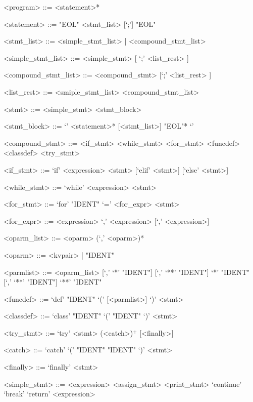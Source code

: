\documentclass[10pt,a4paper]{article}
\begin{document}
\setlength{\grammarparsep}{10pt plus 1pt minus 1pt} %
\setlength{\grammarindent}{12em} %
\begin{grammar}


<program> ::= <statement>*

<statement> ::= "EOL" 
    \alt <stmt_list> [`;'] "EOL"

<stmt_list> ::= <simple_stmt_list> | <compound_stmt_list>

<simple_stmt_list> ::= <simple_stmt> [ `;' <list_rest> ]

<compound_stmt_list> ::= <compound_stmt> [`;' <list_rest> ]

<list_rest> ::= <smiple_stmt_list> 
    \alt <compound_stmt_list>

<stmt> ::= <simple_stmt> 
    \alt <stmt_block>

<stmt_block> ::= `{' <statement>* [<stmt_list>] "EOL"* `}'

<compound_stmt> ::= <if_stmt>
	\alt <while_stmt>
	\alt <for_stmt>
	\alt <funcdef>
    \alt <classdef>
    \alt <try_stmt>

<if_stmt> ::= `if' <expression> <stmt> [`elif' <stmt>] [`else' <stmt>]
              
<while_stmt> ::= `while' <expression> <stmt>

<for_stmt> ::= `for' "IDENT" `=' <for_expr> <stmt>

<for_expr> ::= <expression> `,' <expression> [`,' <expression>]

<oparm_list> ::= <oparm> (`,' <oparm>)*

<oparm> ::= <kvpair> | "IDENT"

<parmlist> ::= <oparm_list> [`,' `*' "IDENT"] [`,' `**' "IDENT"]
    \alt `*' "IDENT" [`,' `**' "IDENT"]
    \alt `**' "IDENT"

<funcdef> ::= `def' "IDENT" `(' [<parmlist>] `)' <stmt>

<classdef> ::= `class' "IDENT" `(' "IDENT" `)' <stmt>

<try_stmt> ::= `try' <stmt> (<catch>)$^{+}$ [<finally>]

<catch> ::= `catch' `(' "IDENT" "IDENT" `)' <stmt>

<finally> ::= `finally' <stmt>

<simple_stmt> ::= <expression>
	\alt <assign_stmt>                    
	\alt <print_stmt>
	\alt `continue'
	\alt `break'
	\alt `return' <expression>
	

\end{grammar}
\end{document}
